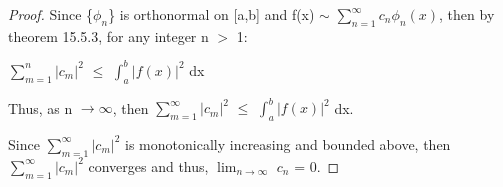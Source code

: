     \begin{proof}
        Since \{$\phi_n$\} is orthonormal on [a,b] and
        f(x) $\sim$ $\sum_{n=1}^{\infty} c_n\phi_n(x)$, then by
        {\color{red} theorem 15.5.3}, for any integer n $>$ 1:

        \hspace{0.5cm}
        $\sum_{m=1}^n |c_m|^2$ $\leq$ $\int_a^b |f(x)|^2$ dx

        Thus, as n $\rightarrow \infty$, then
        $\sum_{m=1}^{\infty} |c_m|^2$ $\leq$ $\int_a^b |f(x)|^2$ dx.

        Since $\sum_{m=1}^{\infty} |c_m|^2$ is monotonically increasing
        and bounded above, then $\sum_{m=1}^{\infty} |c_m|^2$ converges
        and thus, $\lim_{n \rightarrow \infty}$ $c_n$ = 0.
    \end{proof}

    \newpage



